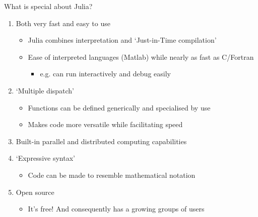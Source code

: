 \documentclass[aspectratio=169]{beamer}
\begin{document}
\begin{frame}{What is special about Julia?}


\vspace{0.5cm}
\begin{enumerate}
	\item Both very fast and easy to use
	\begin{itemize}
		\item Julia combines interpretation and `Just-in-Time compilation' 
		\item Ease of interpreted languages (Matlab) while nearly as fast as C/Fortran
		\begin{itemize}
			\item e.g. can run interactively and debug easily
		\end{itemize}
	\end{itemize}

	\vspace{0.5cm}
	\item `Multiple dispatch'
	\begin{itemize}
	\item Functions can be defined generically and specialised by use
	\item Makes code more versatile while facilitating speed
	\end{itemize}	
	
	\vspace{0.5cm}
	\item Built-in parallel and distributed computing capabilities

	\vspace{0.5cm}
	\item `Expressive syntax'
	\begin{itemize}
		\item Code can be made to resemble mathematical notation
	\end{itemize}

	\vspace{0.5cm}
	\item Open source
	\begin{itemize}
	\item It's free! And consequently has a growing groups of users
\end{itemize}	
\end{enumerate}

\vspace{1cm}



\end{frame}
\end{document}
